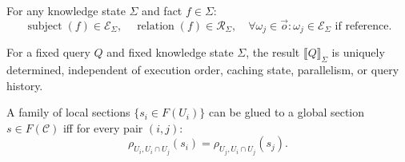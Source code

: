 \begin{theorem}
\label{thm:integrity}
For any knowledge state $\Sigma$ and fact $f \in \Sigma$:
\[
\operatorname{subject}(f) \in \mathcal{E}_\Sigma,\quad
\operatorname{relation}(f) \in \mathcal{R}_\Sigma,\quad
\forall \omega_j \in \vec{o}: \omega_j \in \mathcal{E}_\Sigma \text{ if reference}.
\]
\end{theorem}

\begin{theorem}
\label{thm:determinism}
For a fixed query $Q$ and fixed knowledge state $\Sigma$,
the result $\llbracket Q \rrbracket_\Sigma$ is uniquely determined,
independent of execution order, caching state, parallelism, or query history.
\end{theorem}

\begin{theorem}
\label{thm:global}
A family of local sections $\{s_i \in F(U_i)\}$ can be glued to a global section
$s \in F(\mathcal{C})$ iff for every pair $(i,j)$:
\[
\rho_{U_i, U_i \cap U_j}(s_i) = \rho_{U_j, U_i \cap U_j}(s_j).
\]
\end{theorem}
